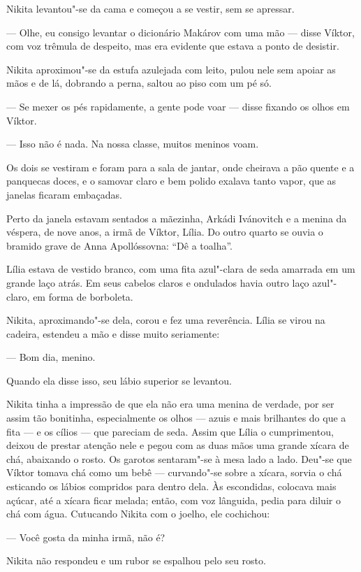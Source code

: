 Nikita levantou"-se da cama e começou a se vestir, sem se apressar.

--- Olhe, eu consigo levantar o dicionário Makárov com uma mão --- disse
Víktor, com voz trêmula de despeito, mas era evidente que estava a ponto
de desistir.

Nikita aproximou"-se da estufa azulejada com leito, pulou nele sem
apoiar as mãos e de lá, dobrando a perna, saltou ao piso com um pé só.

--- Se mexer os pés rapidamente, a gente pode voar --- disse fixando os
olhos em Víktor.

--- Isso não é nada. Na nossa classe, muitos meninos voam.

Os dois se vestiram e foram para a sala de jantar, onde cheirava a pão
quente e a panquecas doces, e o samovar claro e bem polido exalava tanto
vapor, que as janelas ficaram embaçadas.

Perto da janela estavam sentados a mãezinha, Arkádi Ivánovitch e a
menina da véspera, de nove anos, a irmã de Víktor, Lília. Do outro
quarto se ouvia o bramido grave de Anna Apollóssovna: ``Dê a toalha''.

Lília estava de vestido branco, com uma fita azul"-clara de seda amarrada
em um grande laço atrás. Em seus cabelos claros e ondulados havia outro
laço azul"-claro, em forma de borboleta.

Nikita, aproximando"-se dela, corou e fez uma reverência. Lília se virou
na cadeira, estendeu a mão e disse muito seriamente:

--- Bom dia, menino.

Quando ela disse isso, seu lábio superior se levantou.

Nikita tinha a impressão de que ela não era uma menina de verdade, por
ser assim tão bonitinha, especialmente os olhos --- azuis e mais
brilhantes do que a fita --- e os cílios --- que pareciam de seda. Assim
que Lília o cumprimentou, deixou de prestar atenção nele e pegou com as
duas mãos uma grande xícara de chá, abaixando o rosto. Os garotos
sentaram"-se à mesa lado a lado. Deu"-se que Víktor tomava chá como um
bebê --- curvando"-se sobre a xícara, sorvia o chá esticando os lábios
compridos para dentro dela. Às escondidas, colocava mais açúcar, até a
xícara ficar melada; então, com voz lânguida, pedia para diluir o chá
com água. Cutucando Nikita com o joelho, ele cochichou:

--- Você gosta da minha irmã, não é?

Nikita não respondeu e um rubor se espalhou pelo seu rosto.


